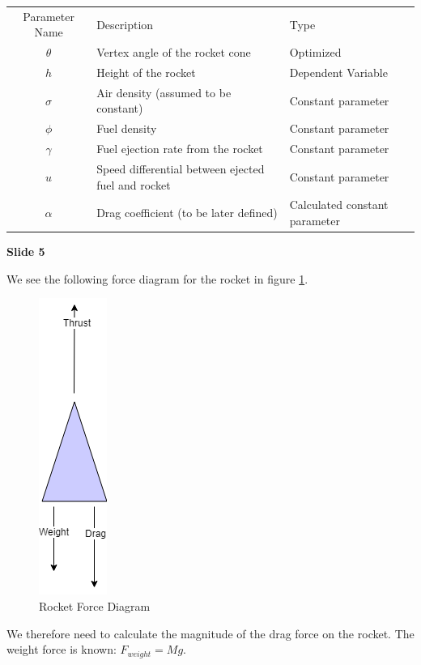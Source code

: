\documentclass[]{article}
\begin{document}
\begin{center}
	\begin{tabular} {c l l}
		Parameter Name & Description & Type \\
		$\theta$ & Vertex angle of the rocket cone & Optimized\\
		$h$ & Height of the rocket & Dependent Variable\\
		$\sigma$ & Air density (assumed to be constant) & Constant parameter\\
		$\phi$ & Fuel density & Constant parameter\\
		$\gamma$ & Fuel ejection rate from the rocket & Constant parameter\\
		$u$ & Speed differential between ejected fuel and rocket & Constant parameter\\
		$\alpha$ & Drag coefficient (to be later defined) & Calculated constant parameter
	\end{tabular}
\end{center}


\textbf{Slide 5}

We see the following force diagram for the rocket in figure \ref{forces}.

\begin{figure}[h]
	\begin{center}
		\caption{Rocket Force Diagram}
		\label{forces}
		\includegraphics[scale=0.5]{forces.png}
	\end{center}
\end{figure}


We therefore need to calculate the magnitude of the drag force on the rocket. The weight force is known: $F_{weight} = Mg$.
\end{document}
